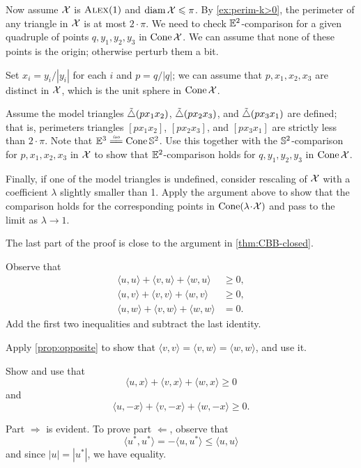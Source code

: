 Now assume $\mathcal{X}$ is $\textsc{Alex}(1)$ and $\operatorname{\rm diam}\nolimits\mathcal{X}\leqslant \pi$.
By \ref{ex:perim-k>0}, the perimeter of any triangle in $\mathcal{X}$ is at most $2\cdot\pi$.
We need to check $\mathbb{E}^2$-comparison for a given quadruple of points $q,y_1,y_2,y_3$ in $\mathop{\rm Cone}\nolimits\mathcal{X}$.
We can assume that none of these points is the origin; otherwise perturb them a bit.

Set $x_i=y_i/|y_i|$ for each $i$ and $p=q/|q|$; we can assume that $p,x_1,x_2,x_3$ are distinct in $\mathcal{X}$, which is the unit sphere in $\mathop{\rm Cone}\nolimits\mathcal{X}$.

Assume the model triangles $\tilde\triangle(px_1x_2)$, $\tilde\triangle(px_2x_3)$, and $\tilde\triangle(px_3x_1)$ are defined;
that is, perimeters triangles $[px_1x_2]$, $[px_2x_3]$, and $[px_3x_1]$ are strictly less than $2\cdot\pi$. 
Note that $\EE^3\iso\Cone\SSS^2$.
Use this together with the $\mathbb{S}^2$-comparison for $p,x_1,x_2,x_3$ in $\mathcal{X}$ to show that $\mathbb{E}^2$-comparison holds for $q,y_1,y_2,y_3$ in $\mathop{\rm Cone}\nolimits\mathcal{X}$.

Finally, if one of the model triangles is undefined, consider rescaling of $\mathcal{X}$ with a coefficient $\lambda$ slightly smaller than 1.
Apply the argument above to show that the comparison holds for the corresponding points in $\Cone(\lambda\cdot\spc{X})$ and pass to the limit as $\lambda\to 1$.

The last part of the proof is close to the argument in \ref{thm:CBB-closed}.

Observe that
\begin{align*}
\langle u,u\rangle+\langle v,u\rangle+\langle w,u\rangle &\ge 0,
\\
\langle u,v\rangle+\langle v,v\rangle+\langle w,v\rangle &\ge 0,
\\
\langle u,w\rangle+\langle v,w\rangle+\langle w,w\rangle &= 0.
\end{align*}
Add the first two inequalities and subtract the last identity.

Apply \ref{prop:opposite} to show that 
$\langle v,v\rangle =\langle v,w\rangle=\langle w,w\rangle$,
and use it.

 Show and use that
\[\langle u,x\rangle +\langle v,x\rangle +\langle w,x\rangle \ge 0\]
and
\[\langle u,-x\rangle +\langle v,-x\rangle +\langle w,-x\rangle \ge 0.\]

 Part $\Rightarrow$ is evident.
To prove part $\Leftarrow$, observe that 
\[\langle u^*,u^*\rangle =-\langle u,u^*\rangle\le \langle u,u\rangle\]
and since $|u|=|u^*|$, we have equality.

